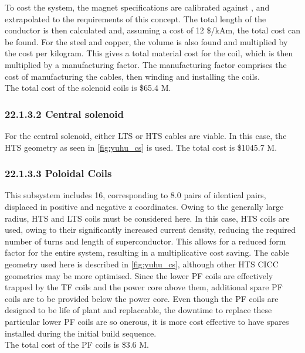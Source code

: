 To cost the system, the magnet specifications are calibrated against \cite{Menard2016}, and extrapolated to the requirements of this concept. The total length of the conductor is then calculated and, assuming a cost of 12 \$/kAm, the total cost can be found. For the steel and copper, the volume is also found and multiplied by the cost per kilogram. This gives a total material cost for the coil, which is then multiplied by a manufacturing factor. The manufacturing factor comprises the cost of manufacturing the cables, then winding and installing the coils. \\

The total cost of the solenoid coils is \$65.4 M.

\subsubsection*{22.1.3.2 Central solenoid}

For the central solenoid, either LTS or HTS cables are viable. In this case, the HTS geometry as seen in \ref{fig:yuhu_cs} is used. The total cost is \$1045.7 M.

\subsubsection*{22.1.3.3 Poloidal Coils}

This subsystem includes 16, corresponding to 8.0 pairs of identical pairs, displaced in positive and negative z coordinates. Owing to the generally large radius, HTS and LTS coils must be considered here. In this case, HTS coils are used, owing to their significantly increased current density, reducing the required number of turns and length of superconductor. This allows for a reduced form factor for the entire system, resulting in a multiplicative cost saving. The cable geometry used here is described in \ref{fig:yuhu_cs}, although other HTS CICC geometries may be more optimised.
Since the lower PF coils are effectively trapped by the TF coils and the power core above them, additional spare PF coils are to be provided below the power core. Even though the PF coils are designed to be life of plant and replaceable, the downtime to replace these particular lower PF coils are so onerous, it is more cost effective to have spares installed during the initial build sequence.  \\

The total cost of the PF coils is \$3.6 M. \\

